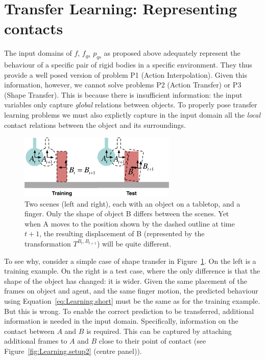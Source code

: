 \section{Transfer Learning: Representing contacts}
\label{sec:InfoForPrediction}

The input domains of $f$, $f_{qs}$ $p_{qs}$ as proposed above  adequately represent the behaviour of a specific pair of rigid bodies in a specific environment. They thus provide a well posed version of problem P1 (Action Interpolation). Given this information, however, we cannot solve problems P2 (Action Transfer) or P3 (Shape Transfer). This is because there is insufficient information: the input variables only capture {\em global} relations between objects. To properly pose transfer learning problems we must also explictly capture in the input domain all the {\em local} contact relations between the object and its surroundings. 

\begin{figure}[t]
\centerline{\includegraphics[width=7.5cm]{shapes-colour}}
\caption[Shapes]{Two scenes (left and right),
each with an object on a tabletop, and a finger.
Only the shape of object B differs between the scenes.
Yet when A moves to the position shown by the dashed outline at time $t+1$,
the resulting displacement of B
(represented by the transformation $T^{B_{t}, B_{t+1}}$)
will be quite different.}
\label{fig:Learning.shapes}
\end{figure}

To see why, consider a simple case of shape transfer in Figure~\ref{fig:Learning.shapes}. On the left is a training example. On the right is a test case, where the only difference is that the shape of the object has changed: it is wider. Given the same placement of the frames on object and agent, and the same finger motion, the predicted behaviour using Equation~\eqref{eq:Learning.short} must be the same as for the training example. But this is wrong. To enable the correct prediction to be transferred, additional information is needed in the input domain. Specifically, information on the contact between $A$ and $B$ is required. This can be captured by attaching additional frames to $A$ and $B$ close to their point of contact (see Figure~\ref{fig:Learning.setup2} (centre panel)).

